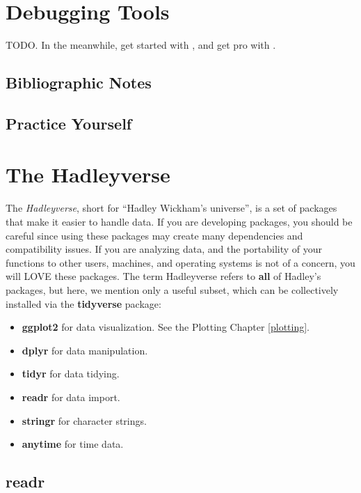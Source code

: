 \documentclass[]{book}
\providecommand{\tightlist}{%
  \setlength{\itemsep}{0pt}\setlength{\parskip}{0pt}}
\theoremstyle{definition}
\theoremstyle{definition}
\theoremstyle{definition}
\theoremstyle{remark}
\begin{document}
\chapter{Debugging Tools}\label{debugging}

TODO. In the meanwhile, get started with \citet{wickham2011testthat},
and get pro with \citet{cotton2017testing}.

\section{Bibliographic Notes}\label{bibliographic-notes-18}

\section{Practice Yourself}\label{practice-yourself-16}

\chapter{The Hadleyverse}\label{hadley}

The \emph{Hadleyverse}, short for ``Hadley Wickham's universe'', is a
set of packages that make it easier to handle data. If you are
developing packages, you should be careful since using these packages
may create many dependencies and compatibility issues. If you are
analyzing data, and the portability of your functions to other users,
machines, and operating systems is not of a concern, you will LOVE these
packages. The term Hadleyverse refers to \textbf{all} of Hadley's
packages, but here, we mention only a useful subset, which can be
collectively installed via the \textbf{tidyverse} package:

\begin{itemize}
\tightlist
\item
  \textbf{ggplot2} for data visualization. See the Plotting Chapter
  \ref{plotting}.
\item
  \textbf{dplyr} for data manipulation.
\item
  \textbf{tidyr} for data tidying.
\item
  \textbf{readr} for data import.
\item
  \textbf{stringr} for character strings.
\item
  \textbf{anytime} for time data.
\end{itemize}

\section{readr}\label{readr}
\end{document}
